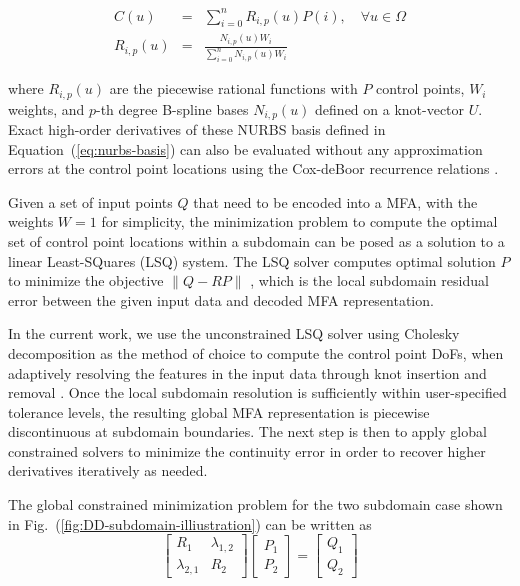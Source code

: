 \documentclass[conference]{IEEEtran}
\newcommand{\eqt}[1]{Equation~(\ref{#1})}
\newcommand{\fig}[1]{Fig.~(\ref{#1})}
\begin{document}
\begin{eqnarray}
C(u) &=& \sum_{i=0}^{n} R_{i,p}(u) P(i), \quad \forall u \in \Omega \\
R_{i,p}(u) &=& \frac{N_{i,p}(u) W_i}{\sum_{i=0}^{n} N_{i,p}(u) W_i}
\label{eq:nurbs-basis}
\end{eqnarray}

where $R_{i,p}(u)$ are the piecewise rational functions with $P$ control points, $W_i$ weights, and $p$-th degree B-spline bases $N_{i,p}(u)$ defined on a knot-vector $U$. Exact high-order derivatives of these NURBS basis defined in \eqt{eq:nurbs-basis} can also be evaluated without any approximation errors at the control point locations using the Cox-deBoor recurrence relations \cite{de1983approximation}.

Given a set of input points $Q$ that need to be encoded into a MFA, with the weights $W=1$ for simplicity, the minimization problem to compute the optimal set of control point locations within a subdomain can be posed as a solution to a linear Least-SQuares (LSQ) system. The LSQ solver computes optimal solution $P$ to minimize the objective $\left\lVert Q - R P \right\rVert$ \cite{nurbs-book}, which is the local subdomain residual error between the given input data and decoded MFA representation.


In the current work, we use the unconstrained LSQ solver using Cholesky decomposition as the method of choice to compute the control point DoFs, when adaptively resolving the features in the input data through knot insertion and removal \cite{li-adaptive-2005}. Once the local subdomain resolution is sufficiently within user-specified tolerance levels, the resulting global MFA representation is piecewise discontinuous at subdomain boundaries. The next step is then to apply global constrained solvers to minimize the continuity error in order to recover higher derivatives iteratively as needed.

The global constrained minimization problem for the two subdomain case shown in \fig{fig:DD-subdomain-illiustration} can be written as
%
\begin{equation}
\left[
\begin{array}{c|c}
R_{1} & \lambda_{1,2} \\
\hline
\lambda_{2,1} & R_{2}
\end{array}
\right]
\left[
\begin{array}{c}
P_{1} \\
P_{2}
\end{array}
\right]
=
\left[
\begin{array}{c}
Q_{1} \\
Q_{2}
\end{array}
\right]
\label{eq:global-system}
\end{equation}
\end{document}
